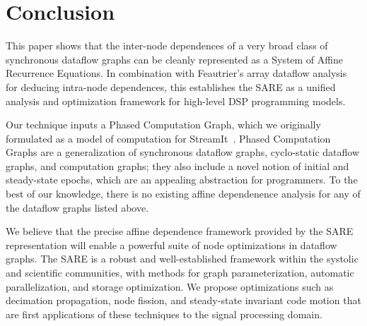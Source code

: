 \section{Conclusion}

This paper shows that the inter-node dependences of a very broad class
of synchronous dataflow graphs can be cleanly represented as a System
of Affine Recurrence Equations.  In combination with Feautrier's array
dataflow analysis~\cite{Feautrier01} for deducing intra-node
dependences, this establishes the SARE as a unified analysis and
optimization framework for high-level DSP programming models.

Our technique inputs a Phased Computation Graph, which we originally
formulated as a model of computation for StreamIt~\cite{streamitcc}.
Phased Computation Graphs are a generalization of synchronous dataflow
graphs, cyclo-static dataflow graphs, and computation graphs; they
also include a novel notion of initial and steady-state epochs, which
are an appealing abstraction for programmers.  To the best of our
knowledge, there is no existing affine dependenence analysis for any
of the dataflow graphs listed above.

We believe that the precise affine dependence framework provided by
the SARE representation will enable a powerful suite of node
optimizations in dataflow graphs.  The SARE is a robust and
well-established framework within the systolic and scientific
communities, with methods for graph parameterization, automatic
parallelization, and storage optimization.  We propose optimizations
such as decimation propagation, node fission, and steady-state
invariant code motion that are first applications of these techniques
to the signal processing domain.
